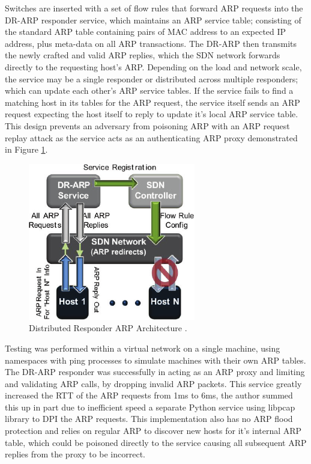 \documentclass[12pt, oneside]{book}
\begin{document}
Switches are inserted with a set of flow rules that forward ARP requests into the DR-ARP responder service, 
which maintains an ARP service table; consisting of the standard ARP table containing pairs of MAC address to an expected IP address,
plus meta-data on all ARP transactions. The DR-ARP then transmits the newly crafted and valid ARP replies, which the
SDN network forwards directly to the requesting host's ARP. Depending on the load and network scale, the service may be 
a single responder or distributed across multiple responders; which can update each other's ARP service tables.
If the service fails to find a matching host in its tables
for the ARP request, the service itself sends an ARP request expecting the host itself to reply to update it's local ARP service table.
This design prevents an adversary from poisoning ARP with an ARP request replay attack as the service acts as an authenticating ARP proxy
demonstrated in Figure \ref{fig:dr-arpLIT}.

\begin{figure}[H]
  \centering
  \includegraphics[scale=0.62]{images/dr_arpLIT.png}
  \caption{Distributed Responder ARP Architecture \cite{matties2017distributed}.}
  \label{fig:dr-arpLIT}
\end{figure}

Testing was performed within a virtual network on a single machine, using namespaces with ping processes to simulate machines with their own 
ARP tables. The DR-ARP responder was successfully in acting as an ARP proxy and limiting and validating ARP calls, by dropping invalid ARP packets.
This service greatly increased the RTT of the ARP requests from 1ms to 6ms, the author summed this up in part due to
inefficient speed a separate Python service using libpcap library to DPI the ARP requests. This implementation also has no ARP flood
protection and relies on regular ARP to discover new hosts for it's internal ARP table, which could be poisoned directly to the service
causing all subsequent ARP replies from the proxy to be incorrect.
\end{document}
